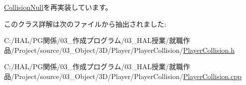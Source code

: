 \mbox{\hyperlink{class_collision_null_a5e5e094e3fbe3ccc0515e485c739bd15}{Collision\+Null}}を再実装しています。



このクラス詳解は次のファイルから抽出されました\+:\begin{DoxyCompactItemize}
\item 
C\+:/\+H\+A\+L/\+P\+G関係/03\+\_\+作成プログラム/03\+\_\+\+H\+A\+L授業/就職作品/\+Project/source/03\+\_\+\+Object/3\+D/\+Player/\+Player\+Collision/\mbox{\hyperlink{_player_collision_8h}{Player\+Collision.\+h}}\item 
C\+:/\+H\+A\+L/\+P\+G関係/03\+\_\+作成プログラム/03\+\_\+\+H\+A\+L授業/就職作品/\+Project/source/03\+\_\+\+Object/3\+D/\+Player/\+Player\+Collision/\mbox{\hyperlink{_player_collision_8cpp}{Player\+Collision.\+cpp}}\end{DoxyCompactItemize}
